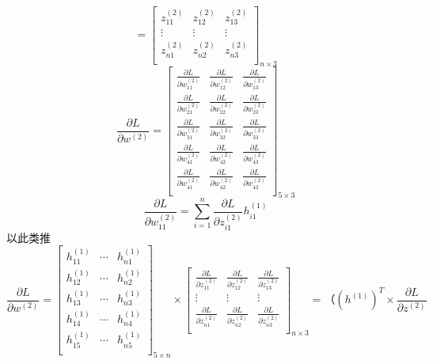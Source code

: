 \documentclass{article}
\begin{document}
	$$
	=\left[                 
	\begin{array}{ccc}  
	z^{(2)}_{11} & z^{(2)}_{12} & z^{(2)}_{13} \\  
	\vdots & \vdots & \vdots \\ 
	z^{(2)}_{n1} & z^{(2)}_{n2} & z^{(2)}_{n3} \\ 
	\end{array}
	\right]_{n\times3}
	$$
	$$\frac{\partial L}{\partial w^{(2)}}=\left[                 
	\begin{array}{ccc}  
	\frac{\partial L}{\partial w^{(2)}_{11}} & \frac{\partial L}{\partial w^{(2)}_{12}} & \frac{\partial L}{\partial w^{(2)}_{13}} \\  
	\frac{\partial L}{\partial w^{(2)}_{21}} & \frac{\partial L}{\partial w^{(2)}_{22}} & \frac{\partial L}{\partial w^{(2)}_{23}} \\  
	\frac{\partial L}{\partial w^{(2)}_{31}} & \frac{\partial L}{\partial w^{(2)}_{32}} & \frac{\partial L}{\partial w^{(2)}_{33}} \\ 
	\frac{\partial L}{\partial w^{(2)}_{41}} & \frac{\partial L}{\partial w^{(2)}_{42}} & \frac{\partial L}{\partial w^{(2)}_{43}} \\ 
	\frac{\partial L}{\partial w^{(2)}_{41}} & \frac{\partial L}{\partial w^{(2)}_{42}} & \frac{\partial L}{\partial w^{(2)}_{43}} \\ 
	\end{array}
	\right]_{5\times3}$$
	$$
	\frac{\partial L}{\partial w^{(2)}_{11}}=\sum_{i=1}^n\frac{\partial L}{\partial z^{(2)}_{i1}}h^{(1)}_{i1}
	$$
	以此类推
	$$\frac{\partial L}{\partial w^{(2)}}=
	\left[ \begin{array}{ccc}  
	h^{(1)}_{11} & \cdots & h^{(1)}_{n1} \\
	h^{(1)}_{12} & \cdots & h^{(1)}_{n2} \\
	h^{(1)}_{13} & \cdots & h^{(1)}_{n3} \\
	h^{(1)}_{14} & \cdots & h^{(1)}_{n4} \\
	h^{(1)}_{15} & \cdots & h^{(1)}_{n5} \\
	\end{array}	\right]_{5\times n}\times \left[                 
	\begin{array}{ccc}  
	\frac{\partial L}{\partial z^{(2)}_{11}} & \frac{\partial L}{\partial z^{(2)}_{12}} & \frac{\partial L}{\partial z^{(2)}_{13}} \\  
	\vdots & \vdots & \vdots \\ 
	\frac{\partial L}{\partial z^{(2)}_{n1}} & \frac{\partial L}{\partial z^{(2)}_{n2}} & \frac{\partial L}{\partial z^{(2)}_{n3}}  \\  
	\end{array}
	\right]_{n\times3}=（(h^{(1)})^T \times \frac{\partial L}{\partial z^{(2)}} 
	$$
\end{document}
